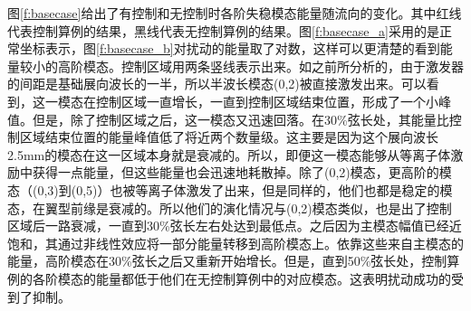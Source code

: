 图\ref{f:basecase}给出了有控制和无控制时各阶失稳模态能量随流向的变化。其中红线代表控制算例的结果，黑线代表无控制算例的结果。图\ref{f:basecase_a}采用的是正常坐标表示，图\ref{f:basecase_b}对扰动的能量取了对数，这样可以更清楚的看到能量较小的高阶模态。控制区域用两条竖线表示出来。如之前所分析的，由于激发器的间距是基础展向波长的一半，所以半波长模态(0,2)被直接激发出来。可以看到，这一模态在控制区域一直增长，一直到控制区域结束位置，形成了一个小峰值。但是，除了控制区域之后，这一模态又迅速回落。在30\%弦长处，其能量比控制区域结束位置的能量峰值低了将近两个数量级。这主要是因为这个展向波长2.5mm的模态在这一区域本身就是衰减的。所以，即便这一模态能够从等离子体激励中获得一点能量，但这些能量也会迅速地耗散掉。除了(0,2)模态，更高阶的模态（(0,3)到(0,5)）也被等离子体激发了出来，但是同样的，他们也都是稳定的模态，在翼型前缘是衰减的。所以他们的演化情况与(0,2)模态类似，也是出了控制区域后一路衰减，一直到30\%弦长左右处达到最低点。之后因为主模态幅值已经近饱和，其通过非线性效应将一部分能量转移到高阶模态上。依靠这些来自主模态的能量，高阶模态在30\%弦长之后又重新开始增长。但是，直到50\%弦长处，控制算例的各阶模态的能量都低于他们在无控制算例中的对应模态。这表明扰动成功的受到了抑制。

